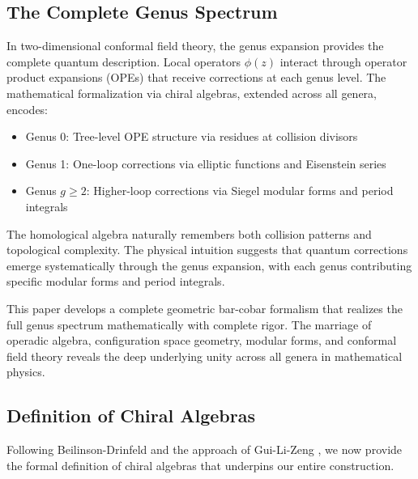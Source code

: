 \subsection{The Complete Genus Spectrum}

In two-dimensional conformal field theory, the genus expansion provides the complete quantum description. Local operators $\phi(z)$ interact through operator product expansions (OPEs) that receive corrections at each genus level. The mathematical formalization via chiral algebras, extended across all genera, encodes:

\begin{itemize}
\item Genus 0: Tree-level OPE structure via residues at collision divisors
\item Genus 1: One-loop corrections via elliptic functions and Eisenstein series
\item Genus $g \geq 2$: Higher-loop corrections via Siegel modular forms and period integrals
\end{itemize}

The homological algebra naturally remembers both collision patterns and topological complexity. The physical intuition suggests that quantum corrections emerge systematically through the genus expansion, with each genus contributing specific modular forms and period integrals.

This paper develops a complete geometric bar-cobar formalism that realizes the full genus spectrum mathematically with complete rigor. The marriage of operadic algebra, configuration space geometry, modular forms, and conformal field theory reveals the deep underlying unity across all genera in mathematical physics.

\subsection{Definition of Chiral Algebras}

Following Beilinson-Drinfeld \cite{BD} and the approach of Gui-Li-Zeng \cite{GLZ}, we now provide the formal definition of chiral algebras that underpins our entire construction.

